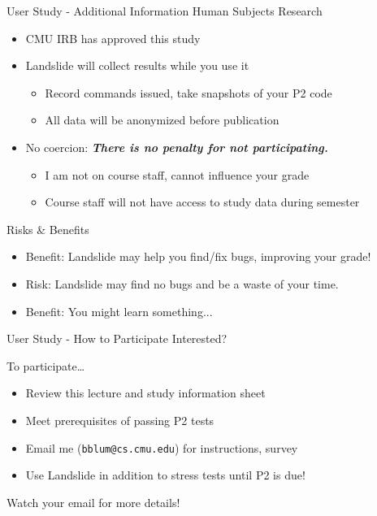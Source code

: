 \documentclass[xcolor=dvipsnames]{beamer}
\begin{document}
\begin{frame}{User Study - Additional Information}
	Human Subjects Research
	\begin{itemize}
		\item CMU IRB has approved this study
		\item Landslide will collect results while you use it
		\begin{itemize}
			\item Record commands issued, take snapshots of your P2 code
			\item All data will be anonymized before publication
		\end{itemize}
		\item No coercion: {\bf \em There is no penalty for not participating.}
		\begin{itemize}
			\item I am not on course staff, cannot influence your grade
			\item Course staff will not have access to study data during semester
		\end{itemize}
	\end{itemize}
	\pause
	\linegap

	Risks \& Benefits
	\begin{itemize}
		\item Benefit: Landslide may help you find/fix bugs, improving your grade!
		\item Risk: Landslide may find no bugs and be a waste of your time.
		\item Benefit: You might learn something...
	\end{itemize}
\end{frame}

\begin{frame}{User Study - How to Participate}
	Interested?
	\linegap

	To participate\dots
	\begin{itemize}
		\item Review this lecture and study information sheet
		\item Meet prerequisites of passing P2 tests
		\item Email me ({\tt bblum@cs.cmu.edu}) for instructions, survey
		\item Use Landslide in addition to stress tests until P2 is due!
	\end{itemize}
	\linegap

	Watch your email for more details!
\end{frame}
\end{document}
